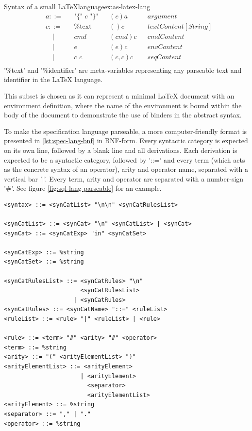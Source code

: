 \begin{example}{Syntax of a small \LaTeX language}{ex:as-latex-lang}
\[\begin{aligned}
       & a ::=       &  & \text{"\{" $c$ "\}"}                    &  & (c)a           &  & argument            \\
       & c ::=       &  & \text{\%text}                           &  & ()c            &  & textContent[String] \\
       & \quad |     &  & \textit{cmd}                            &  & (cmd)c         &  & cmdContent          \\
       & \quad |     &  & \textit{e}                              &  & (e)c           &  & envContent          \\
       & \quad |     &  & \textit{c } \textit{c}                  &  & (c,c)c         &  & seqContent          \\
    \end{aligned}
  \]
  '\%text' and '\%identifier' are meta-variables representing any parseable text and identifier in the LaTeX language.

  This subset is chosen as it can represent a minimal LaTeX document with an environment
  definition, where the name of the environment is bound within the body
  of the document to demonstrate the use of binders in the abstract syntax.
\end{example}

To make the specification language parseable, a more computer-friendly format is
presented in \cref{lst:spec-lang-bnf} in BNF-form. Every syntactic category is
expected on its own line, followed by a blank line and all derivations.
Each derivation is expected to be a syntactic category, followed by '::=' and
every term (which acts as the concrete syntax of an operator), arity and operator
name, separated with a vertical bar '|'. Every term, arity and operator are separated
with a number-sign '\#'. See figure \cref{fig:sql-lang-parseable} for an example.

\begin{lstlisting}[style=inline,caption=The specification language itself in BNF-form,label=lst:spec-lang-bnf]
<syntax> ::= <synCatList> "\n\n" <synCatRulesList>

<synCatList> ::= <synCat> "\n" <synCatList> | <synCat>
<synCat> ::= <synCatExp> "in" <synCatSet>

<synCatExp> ::= %string
<synCatSet> ::= %string

<synCatRulesList> ::= <synCatRules> "\n" 
                      <synCatRulesList> 
                    | <synCatRules>
<synCatRules> ::= <synCatName> "::=" <ruleList>
<ruleList> ::= <rule> "|" <ruleList> | <rule>

<rule> ::= <term> "#" <arity> "#" <operator>
<term> ::= %string
<arity> ::= "(" <arityElementList> ")"
<arityElementList> ::= <arityElement> 
                      | <arityElement> 
                        <separator> 
                        <arityElementList>
<arityElement> ::= %string
<separator> ::= "," | "."
<operator> ::= %string
\end{lstlisting}


